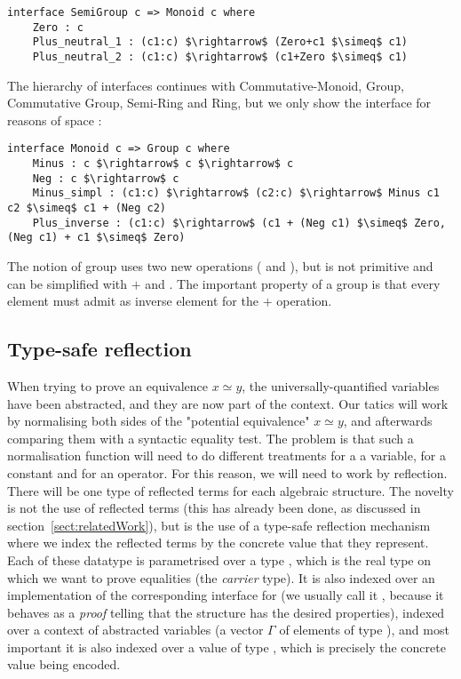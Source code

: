 \begin{lstlisting}
interface SemiGroup c => Monoid c where
    Zero : c    
    Plus_neutral_1 : (c1:c) $\rightarrow$ (Zero+c1 $\simeq$ c1)    
    Plus_neutral_2 : (c1:c) $\rightarrow$ (c1+Zero $\simeq$ c1)
\end{lstlisting}

The hierarchy of interfaces continues with Commutative-Monoid, Group, Commutative Group, Semi-Ring and Ring, but we only show the  interface for reasons of space :

\begin{lstlisting}
interface Monoid c => Group c where
    Minus : c $\rightarrow$ c $\rightarrow$ c
    Neg : c $\rightarrow$ c
    Minus_simpl : (c1:c) $\rightarrow$ (c2:c) $\rightarrow$ Minus c1 c2 $\simeq$ c1 + (Neg c2) 
    Plus_inverse : (c1:c) $\rightarrow$ (c1 + (Neg c1) $\simeq$ Zero, (Neg c1) + c1 $\simeq$ Zero)
\end{lstlisting}

The notion of group uses two new operations ( and ), but  is not primitive and can be simplified with $+$ and . The important property of a group is that every element  must admit  as inverse element for the $+$ operation.

\subsection{Type-safe reflection}
\label{sect:typeSafeReflection}
			
When trying to prove an equivalence $x \simeq y$, the universally-quantified variables have been abstracted, and they are now part of the context. Our tatics will work by normalising both sides of the "potential equivalence" $x \simeq y$, and afterwards comparing them with a syntactic equality test. The problem is that such a normalisation function will need to do different treatments for a a variable, for a constant and for an operator. For this reason, we will need to work by reflection. There will be one type of reflected terms for each algebraic structure. The novelty is not the use of reflected terms (this has already been done, as discussed in section~\ref{sect:relatedWork}), but is the use of a type-safe reflection mechanism where we index the reflected terms by the concrete value that they represent. Each of these datatype is parametrised over a type , which is the real type on which we want to prove equalities (the \emph{carrier} type). It is also indexed over an implementation of the corresponding interface for  (we usually call it , because it behaves as a \emph{proof} telling that the structure  has the desired properties), indexed over a context of abstracted variables (a vector $\Gamma$ of  elements of type ), and most important it is also indexed over a value of type , which is precisely the concrete value being encoded.

